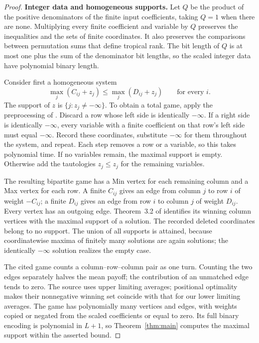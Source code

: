 \begin{proof}
\noindent\textbf{Integer data and homogeneous supports.}\enspace
Let $Q$ be the product of the positive denominators of the finite input
coefficients, taking $Q=1$ when there are none. Multiplying every finite
coefficient and variable by $Q$ preserves the inequalities and the sets
of finite coordinates. It also preserves the comparisons between
permutation sums that define tropical rank. The bit length of $Q$ is
at most one plus the sum of the denominator bit lengths, so the scaled integer
data have polynomial binary length.

Consider first a homogeneous system
\begin{equation}
 \max_j(C_{ij}+z_j)\leq\max_j(D_{ij}+z_j)
 \qquad\text{for every }i.
 \label{eq:tropical-homogeneous}
\end{equation}
The support of $z$ is $\{j:z_j\ne-\infty\}$. To obtain a total game,
apply the preprocessing of \cite[Section~2.1]{AkianGaubertGuterman2012}.
Discard a row whose left side is identically $-\infty$. If a right
side is identically $-\infty$, every variable with a finite coefficient
on that row's left side must equal $-\infty$. Record these coordinates,
substitute $-\infty$ for them throughout the system, and repeat.
Each step removes a row or a variable, so this takes polynomial time.
If no variables remain, the maximal support is empty. Otherwise add
the tautologies $z_j\leq z_j$ for the remaining variables.

The resulting bipartite game has a Min vertex for each remaining column
and a Max vertex for each row. A finite $C_{ij}$ gives an edge from
column $j$ to row $i$ of weight $-C_{ij}$; a finite $D_{ij}$ gives
an edge from row $i$ to column $j$ of weight $D_{ij}$. Every vertex
has an outgoing edge. Theorem~3.2 of
\cite{AkianGaubertGuterman2012} identifies its winning column vertices
with the maximal support of a solution. The recorded deleted coordinates
belong to no support. The union of all supports is attained, because
coordinatewise maxima of finitely many solutions are again solutions;
the identically $-\infty$ solution realizes the empty case.

The cited game counts a column--row--column pair as one turn. Counting
the two edges separately halves the mean payoff; the contribution of
an unmatched edge tends to zero. The source uses upper limiting averages;
positional optimality makes their nonnegative winning set coincide with
that for our lower limiting averages. The game has
polynomially many vertices and edges, with weights copied or negated
from the scaled coefficients or equal to zero. Its full binary encoding
is polynomial in $L+1$, so Theorem~\ref{thm:main} computes the maximal
support within the asserted bound.


\end{proof}
